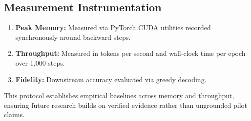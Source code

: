 \documentclass[11pt,a4paper]{article}
\begin{document}
\subsection{Measurement Instrumentation}
\begin{enumerate}
    \item \textbf{Peak Memory:} Measured via PyTorch CUDA utilities recorded synchronously around backward steps.
    \item \textbf{Throughput:} Measured in tokens per second and wall-clock time per epoch over 1,000 steps.
    \item \textbf{Fidelity:} Downstream accuracy evaluated via greedy decoding.
\end{enumerate}

This protocol establishes empirical baselines across memory and throughput, ensuring future research builds on verified evidence rather than ungrounded pilot claims.



\end{document}

